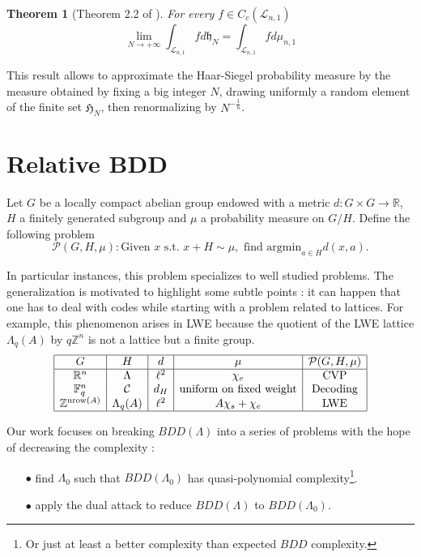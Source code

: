 \documentclass{article}
\newtheorem{theorem}{Theorem}
\begin{document}
\begin{theorem}[Theorem 2.2 of \cite{goldstein2003equidistribution}]
For every $f\in C_c(\mathcal L_{n,1})$
\[\lim_{N\rightarrow +\infty} \int_{\mathcal L_{n,1}} f d\mathfrak h_{N} = \int_{\mathcal L_{n,1}} fd\mu_{n,1}\]
\end{theorem}

This result allows to approximate the Haar-Siegel probability measure by the measure obtained by fixing a big integer $N$, drawing uniformly a random element of the finite set $\mathfrak H_N$, then renormalizing by $N^{-\frac{1}{n}}$.

\section{Relative BDD}%

Let $G$ be a locally compact abelian group endowed with a metric $d : G\times G \rightarrow \mathbb R$, $H$ a finitely generated subgroup and $\mu$ a probability measure on $G/H$. Define the following problem
$$\mathcal P (G,H,\mu) : \text{Given } x \text{ s.t. }x+H \sim \mu , \text{ find argmin}_{a\in H} d(x,a).$$

In particular instances, this problem specializes to well studied problems. The generalization is motivated to highlight some subtle points : it can happen that one has to deal with codes while starting with a problem related to lattices. For example, this phenomenon arises in LWE because the quotient of the LWE lattice $\Lambda_q(A)$ by $q\mathbb Z^n$ is not a lattice but a finite group. 
\[\begin{array}{|c|c|c| c | c|} 
\hline
G             & H                          & d     &  \mu              & \mathcal P (G,H,\mu)\\
\hline
\mathbb R^n   & \Lambda                    & \ell^2 & \chi_e            & \text{CVP}     \\
\mathbb F_q^n & \mathcal C                 & d_H    & \text{uniform on fixed weight}    & \text{Decoding}\\
\mathbb Z^{\text{nrow}(A)}  & \Lambda_q(A) & \ell^2 &  A \chi_s +\chi_e & \text{LWE}     \\
\hline
\end{array}\]

Our work focuses on breaking $BDD(\Lambda)$ into a series of problems with the hope of decreasing the complexity :
\begin{itemize}
\item[$\bullet$] find $\Lambda_0$ such that $BDD(\Lambda_0)$ has quasi-polynomial complexity\footnote{Or just at least a better complexity than expected $BDD$ complexity.}.
\item[$\bullet$] apply the dual attack to reduce $BDD(\Lambda)$ to $BDD(\Lambda_0)$. 
\end{itemize} 
\end{document}
